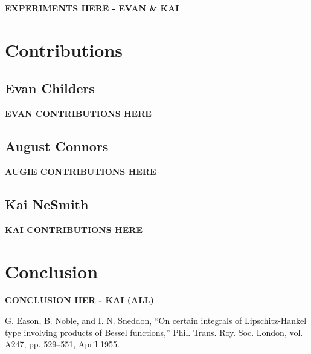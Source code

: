 \documentclass[conference]{IEEEtran}
\begin{document}
\textbf{EXPERIMENTS HERE - EVAN \& KAI}

\section{Contributions}
\subsection{Evan Childers}
\textbf{EVAN CONTRIBUTIONS HERE}
\subsection{August Connors}
\textbf{AUGIE CONTRIBUTIONS HERE}
\subsection{Kai NeSmith}
\textbf{KAI CONTRIBUTIONS HERE}

\section{Conclusion}
\textbf{CONCLUSION HER - KAI (ALL)}

\begin{thebibliography}{00}
 G. Eason, B. Noble, and I. N. Sneddon, ``On certain integrals of Lipschitz-Hankel type involving products of Bessel functions,'' Phil. Trans. Roy. Soc. London, vol. A247, pp. 529--551, April 1955.
\end{thebibliography}
\end{document}
